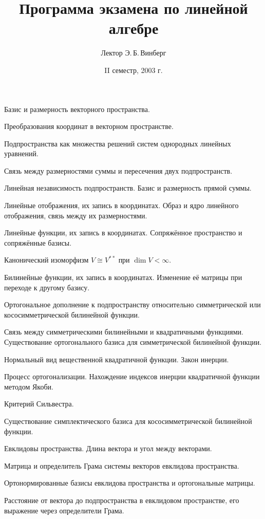 \documentclass[a4paper]{article}
\title{Программа экзамена по линейной алгебре}
\author{Лектор Э.\,Б.\,Винберг}
\date{II семестр, 2003 г.}
\begin{document}
\maketitle
\begin{nums}{-1}
\item Базис и размерность векторного пространства.
\item Преобразования координат в векторном пространстве.
\item Подпространства как множества решений систем однородных линейных уравнений.
\item Связь между размерностями суммы и пересечения двух подпространств.
\item Линейная независимость подпространств. Базис и размерность прямой суммы.
\item Линейные отображения, их запись в координатах. Образ и ядро линейного отображения, связь между их размерностями.
\item Линейные функции, их запись в координатах. Сопряжённое пространство и сопряжённые базисы.
\item Канонический изоморфизм $V \cong V^{**}$ при $\dim V < \infty$.
\item Билинейные функции, их запись в координатах. Изменение её матрицы при переходе к другому базису.
\item Ортогональное дополнение к подпространству относительно симметрической или кососимметрической билинейной функции.
\item Связь между симметрическими билинейными и квадратичными функциями. Существование ортогонального базиса
для симметрической билинейной функции.
\item Нормальный вид вещественной квадратичной функции. Закон инерции.
\item Процесс ортогонализации. Нахождение индексов инерции квадратичной функции методом Якоби.
\item Критерий Сильвестра.
\item Существование симплектического базиса для кососимметрической билинейной функции.
\item Евклидовы пространства. Длина вектора и угол между векторами.
\item Матрица и определитель Грама системы векторов евклидова пространства.
\item Ортонормированные базисы евклидова пространства и ортогональные матрицы.
\item Расстояние от вектора до подпространства в евклидовом пространстве, его выражение через определители Грама.

\end{nums}
\end{document}
